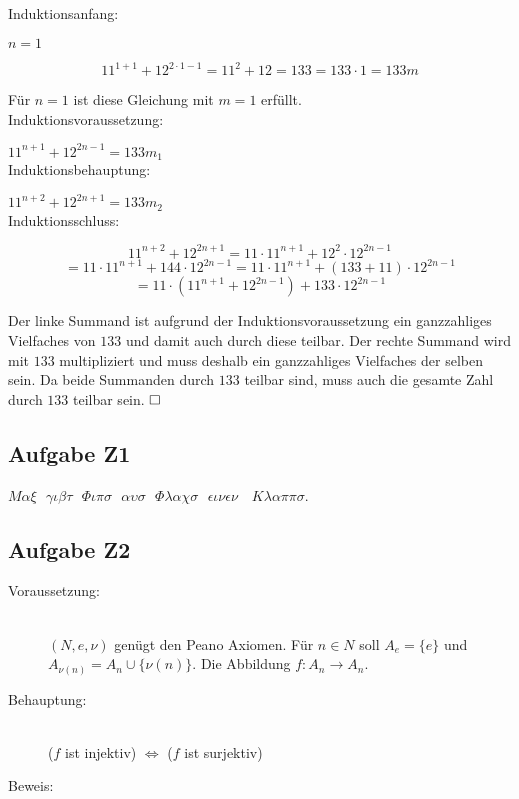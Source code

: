 \documentclass[11pt, a4paper]{article}
\begin{document}
		Induktionsanfang:

		$n=1$

		\[ 11^{1+1} + 12^{2\cdot1-1} = 11^2 +12=133=133 \cdot 1 = 133m \]

		Für $n=1$ ist diese Gleichung mit $m=1$ erfüllt. \\ 


		Induktionsvoraussetzung:

		$11^{n+1} + 12^{2n-1} = 133m_1$ \\


		Induktionsbehauptung:

		$11^{n+2} + 12^{2n+1} = 133m_2$ \\


		Induktionsschluss:

		\[ 11^{n+2} + 12^{2n+1} = 11\cdot11^{n+1} + 12^2 \cdot 12^{2n-1} \]
		\[ = 11\cdot11^{n+1} + 144 \cdot 12^{2n-1} = 11\cdot11^{n+1} + (133 + 11) \cdot 12^{2n-1} \]
		\[ = 11\cdot(11^{n+1} + 12^{2n-1}) + 133\cdot 12^{2n-1} \]

		Der linke Summand ist aufgrund der Induktionsvoraussetzung ein ganzzahliges Vielfaches von $133$ und damit auch durch diese teilbar. Der rechte Summand wird mit $133$ multipliziert und muss deshalb ein ganzzahliges Vielfaches der selben sein. Da beide Summanden durch $133$ teilbar sind, muss auch die gesamte Zahl durch $133$ teilbar sein. $\hfill \Box$



	\subsection*{Aufgabe Z1}

		$ M\alpha\xi \text{ } \gamma\iota\beta\tau \text{ } \Phi\iota\pi\sigma \text{ } \alpha\upsilon\sigma \text{ } \Phi\lambda\alpha\chi\sigma \text{ } \epsilon\iota\nu\epsilon\nu$
		$ \text{ } K\lambda\alpha\pi\pi\sigma \text{.}$




	\subsection*{Aufgabe Z2}


		\begin{description}
			\item[Voraussetzung:] \hfill \\
				$(N,e,\nu)$ genügt den Peano Axiomen. Für $n \in N$ soll $A_e = \{e\}$ und $A_{\nu(n)} = A_n \cup \{\nu(n)\}$. Die Abbildung $f:A_n \longrightarrow A_n$.
			\item[Behauptung:] \hfill \\
				($f$ ist injektiv) $\Leftrightarrow$ ($f$ ist surjektiv)
			\item[Beweis:]
		\end{description}
\end{document}
